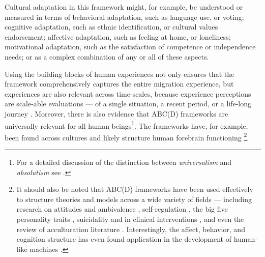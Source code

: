 \documentclass[man, 12pt, a4paper]{apa7}
\begin{document}
Cultural adaptation in this framework might, for example, be understood or measured in terms of behavioral adaptation, such as language use, or voting; cognitive adaptation, such as ethnic identification, or cultural values endorsement; affective adaptation, such as feeling at home, or loneliness; motivational adaptation, such as the satisfaction of competence or independence needs; or as a complex combination of any or all of these aspects. 

Using the building blocks of human experiences not only ensures that the framework comprehensively captures the entire migration experience, but experiences are also relevant across time-scales, because experience perceptions are scale-able evaluations --- of a single situation, a recent period, or a life-long journey \citep[e.g.,][]{Clewett2019}.
Moreover, there is also evidence that ABC(D) frameworks are universally relevant for all human beings\footnote{For a detailed discussion of the distinction between \textit{universalism} and \textit{absolutism} see \citet{Berry2000, Berry2009a}.}. The frameworks have, for example, been found across cultures \citep[e.g.,][]{Bhawuk2011} and likely structure human forebrain functioning \citep{Swanson2020}\footnote{It should also be noted that ABC(D) frameworks have been used effectively to structure theories and models across a wide variety of fields --- including research on attitudes \citep{Breckler1984} and ambivalence \citep{VanHarreveld2015}, self-regulation \citep{Ben-Eliyahu2015}, the big five personality traits \citep{Wilt2016}, suicidality \citep{Harris2015} and in clinical interventions \citep{Eifert1989}, and even the review of acculturation literature \citep{Ward2001, Ward2019}. Interestingly, the affect, behavior, and cognition structure has even found application in the development of human-like machines \citep{Guo2020}.}.
\end{document}
